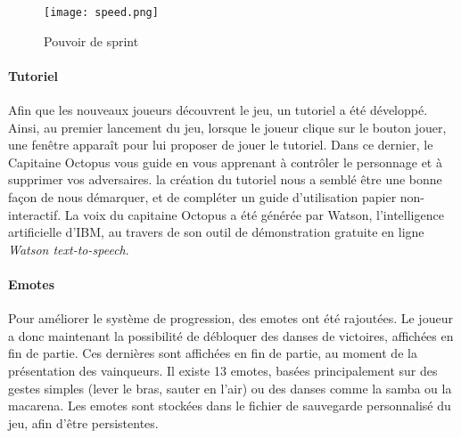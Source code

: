 			\begin{figure}[hbt!]
				\centering
				\texttt{[image: speed.png]}
				\caption{Pouvoir de sprint}
			\end{figure}
			\FloatBarrier

		\paragraph{Tutoriel}

			Afin que les nouveaux joueurs découvrent le jeu, un tutoriel a été développé. Ainsi, au premier lancement du jeu, lorsque le 
			joueur clique sur le bouton jouer, une fenêtre apparaît pour lui proposer de jouer le tutoriel. Dans ce dernier, le Capitaine Octopus vous guide 
			en vous apprenant à contrôler le personnage et à supprimer vos adversaires. la création du tutoriel nous a semblé être une bonne façon de nous 
			démarquer, et de compléter un guide d'utilisation papier non-interactif.
			La voix du capitaine Octopus a été générée par Watson, l'intelligence artificielle d'IBM, au travers de son outil de démonstration gratuite 
			en ligne \textit{Watson text-to-speech}.


		\paragraph{Emotes}

			Pour améliorer le système de progression, des emotes ont été rajoutées. Le joueur a donc maintenant la possibilité de débloquer des 
			danses de victoires, affichées en fin de partie. Ces dernières sont affichées en fin de partie, au moment de la présentation des vainqueurs. 
			Il existe 13 emotes, basées principalement sur des gestes simples (lever le bras, sauter en l'air) ou des danses comme la samba ou la macarena. 
			Les emotes sont stockées dans le fichier de sauvegarde personnalisé du jeu, afin d'être persistentes.
